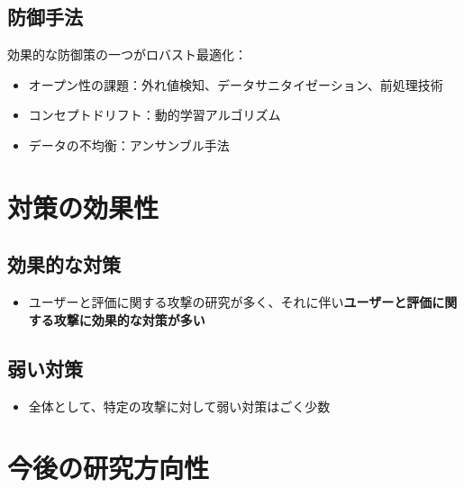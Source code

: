 \documentclass[11pt,a4paper]{article}
\begin{document}
\subsection{防御手法}
効果的な防御策の一つがロバスト最適化：
\begin{itemize}
    \item オープン性の課題：外れ値検知、データサニタイゼーション、前処理技術
    \item コンセプトドリフト：動的学習アルゴリズム
    \item データの不均衡：アンサンブル手法
\end{itemize}

\section{対策の効果性}

\subsection{効果的な対策}
\begin{itemize}
    \item ユーザーと評価に関する攻撃の研究が多く、それに伴い\textbf{ユーザーと評価に関する攻撃に効果的な対策が多い}
\end{itemize}

\subsection{弱い対策}
\begin{itemize}
    \item 全体として、特定の攻撃に対して弱い対策はごく少数
\end{itemize}

\section{今後の研究方向性}
\end{document}
